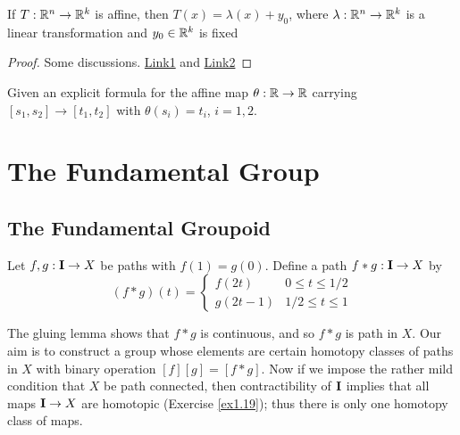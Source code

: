 \documentclass[11pt]{article}
\begin{document}
\begin{exercise}
\label{ex2.4}
If \(T:\mathbb{R}^n\to\mathbb{R}^k\) is affine, then \(T(x)=\lambda(x)+y_0\), where \(\lambda:\mathbb{R}^n\to\mathbb{R}^k\) is a linear transformation
and \(y_0\in\mathbb{R}^k\) is fixed
\end{exercise}

\begin{proof}
Some discussions. \href{https://math.stackexchange.com/questions/1059220/what-is-the-difference-between-linear-transformation-and-affine-transformation}{Link1} and \href{https://math.stackexchange.com/questions/275310/what-is-the-difference-between-linear-and-affine-function}{Link2}
\end{proof}

\begin{exercise}
\label{ex2.7}
Given an explicit formula for the affine map \(\theta:\mathbb{R}\to\mathbb{R}\) carrying \([s_1,s_2]\to[t_1,t_2]\)
with \(\theta(s_i)=t_i\), \(i=1,2\).
\end{exercise}




\section{The Fundamental Group}
\label{sec:org1a3325b}

\subsection{The Fundamental Groupoid}
\label{sec:orgfba7f1f}
\begin{definition}[]
Let \(f,g:\operatorname{\textbf{I}}\to X\) be paths with \(f(1)=g(0)\). Define  a path \(f*g:\operatorname{\textbf{I}}\to X\) by
\begin{equation*}
(f*g)(t)=
\begin{cases}
f(2t)&0\le t\le 1/2\\
g(2t-1)&1/2\le t\le 1
\end{cases}
\end{equation*}
\end{definition}

The gluing lemma shows that \(f*g\) is continuous, and so \(f*g\) is path in \(X\). Our aim is to
construct a group whose elements are certain homotopy classes of paths in \(X\) with binary
operation \([f][g]=[f*g]\). Now if we impose the rather mild condition that \(X\) be path
connected, then contractibility of \(\operatorname{\textbf{I}}\) implies that all maps \(\operatorname{\textbf{I}}\to X\) are homotopic (Exercise
\ref{ex1.19}); thus there is only one homotopy class of maps.
\end{document}
